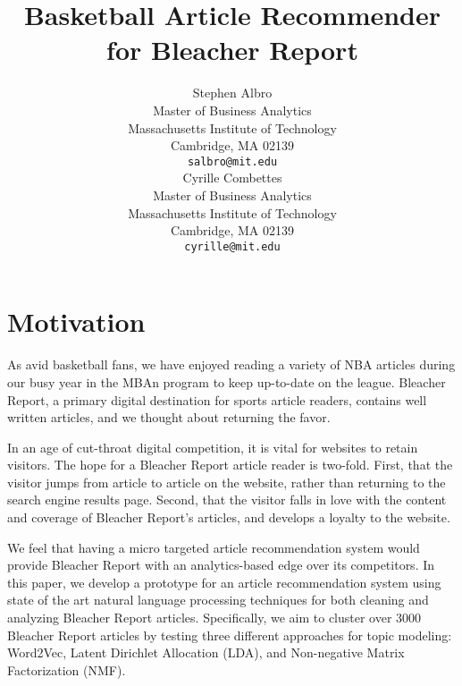 \documentclass{article}
\title{Basketball Article Recommender\\
for Bleacher Report}
\author{
  Stephen Albro\\
  Master of Business Analytics\\
  Massachusetts Institute of Technology\\
  Cambridge, MA 02139\\
  \texttt{salbro@mit.edu}\\
   \And
   Cyrille Combettes \\
   Master of Business Analytics\\
  Massachusetts Institute of Technology\\
  Cambridge, MA 02139\\
   \texttt{cyrille@mit.edu} \\
}
\begin{document}

\maketitle


\section{Motivation}


As avid basketball fans, we have enjoyed reading a variety of NBA articles
during our busy year in the MBAn program
to keep up-to-date on the league. Bleacher Report, a primary digital destination
for sports article readers, contains well written articles, and we thought about returning the
favor.

In an age of cut-throat digital competition, it is vital for websites to retain visitors. The
hope for a Bleacher Report article reader is two-fold. First, that the visitor jumps from article to
article on the website, rather than returning to the search engine results page. Second, that the
visitor falls in love with the content and coverage of Bleacher Report’s articles, and develops a
loyalty to the website.

We feel that having a micro targeted article recommendation system would provide Bleacher 
Report with an analytics-based edge over its competitors. In this paper,
we develop a prototype for an article recommendation system using state of the art natural 
language processing techniques for both cleaning and analyzing Bleacher Report articles. Specifically,
we aim to cluster over 3000 Bleacher Report articles by testing three different approaches
for topic modeling: Word2Vec, Latent Dirichlet Allocation (LDA), 
and Non-negative Matrix Factorization (NMF).
\end{document}
